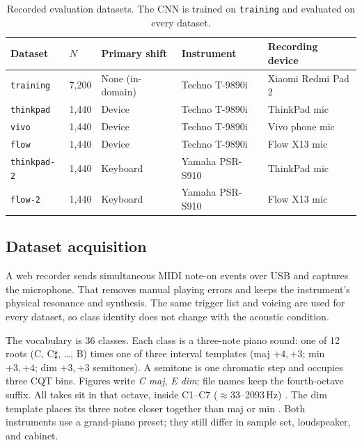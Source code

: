 \documentclass[pdflatex,sn-mathphys-num,iicol]{sn-jnl}
\theoremstyle{thmstyleone}
\theoremstyle{thmstyletwo}
\theoremstyle{thmstylethree}
\begin{document}
\begin{table}[t]
\caption{Recorded evaluation datasets. The CNN is trained on \texttt{training} and evaluated on every dataset.}\label{tab:scenarios}
\begin{tabular*}{\textwidth}{@{\extracolsep{\fill}}lllll@{}}
\toprule
Dataset & $N$ & Primary shift & Instrument & Recording device \\
\midrule
\texttt{training} & 7{,}200 & None (in-domain) & Techno T-9890i & Xiaomi Redmi Pad 2 \\
\texttt{thinkpad} & 1{,}440 & Device & Techno T-9890i & ThinkPad mic \\
\texttt{vivo} & 1{,}440 & Device & Techno T-9890i & Vivo phone mic \\
\texttt{flow} & 1{,}440 & Device & Techno T-9890i & Flow X13 mic \\
\texttt{thinkpad-2} & 1{,}440 & Keyboard & Yamaha PSR-S910 & ThinkPad mic \\
\texttt{flow-2} & 1{,}440 & Keyboard & Yamaha PSR-S910 & Flow X13 mic \\
\bottomrule
\end{tabular*}
\end{table}

\subsection{Dataset acquisition}\label{subsec3_1}

A web recorder sends simultaneous MIDI note-on events over USB and captures the microphone. That removes manual playing errors and keeps the instrument's physical resonance and synthesis. The same trigger list and voicing are used for every dataset, so class identity does not change with the acoustic condition.

The vocabulary is 36 classes. Each class is a three-note piano sound: one of 12 roots (C, C$\sharp$, \ldots, B) times one of three interval templates (maj $+4,+3$; min $+3,+4$; dim $+3,+3$ semitones). A semitone is one chromatic step and occupies three CQT bins. Figures write \emph{C maj}, \emph{E dim}; file names keep the fourth-octave suffix. All takes sit in that octave, inside C1--C7 ($\approx$33--2093\,Hz) \cite{Telila2023}\cite{Harte2010}. The dim template places its three notes closer together than maj or min \cite{Byambatsogt2020}. Both instruments use a grand-piano preset; they still differ in sample set, loudspeaker, and cabinet.
\end{document}
